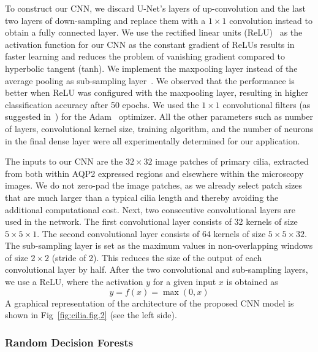 To construct our CNN, we discard U-Net's layers of up-convolution and the last two layers of down-sampling and replace them with a $1 \times 1$ convolution instead to obtain a fully connected layer. We use the rectified linear units (ReLU)~\cite{ronneberger_UNet_2015} as the activation function for our CNN as the constant gradient of ReLUs results in faster learning and reduces the problem of vanishing gradient compared to hyperbolic tangent (tanh). We implement the maxpooling layer instead of the average pooling as sub-sampling layer~\cite{krizhevsky_Imagenet_2017}. We observed that the performance is better when ReLU was configured with the maxpooling layer, resulting in higher classification accuracy after 50 epochs. We used the $1 \times 1$ convolutional filters (as suggested in~\cite{gupta_Convolutional_2017}) for the Adam~\cite{kingma_Variational_2015} optimizer. All the other parameters such as number of layers, convolutional kernel size, training algorithm, and the number of neurons in the final dense layer were all experimentally determined for our application.

The inputs to our CNN are the $32 \times 32$ image patches of primary cilia, extracted from both within AQP2 expressed regions and elsewhere within the microscopy images. We do not zero-pad the image patches, as we already select patch sizes that are much larger than a typical cilia length and thereby avoiding the additional computational cost. Next, two consecutive convolutional layers are used in the network. The first convolutional layer consists of 32 kernels of size $5 \times 5 \times 1$. The second convolutional layer consists of 64 kernels of size $5 \times 5 \times 32$. The sub-sampling layer is set as the maximum values in non-overlapping windows of size $2 \times 2$ (stride of 2). This reduces the size of the output of each convolutional layer by half. After the two convolutional and sub-sampling layers, we use a ReLU, where the activation $y$ for a given input $x$ is obtained as
\begin{equation}
y = f(x) = \max{(0,x)}
\label{eq:cilia.eq.1}
\end{equation}
A graphical representation of the architecture of the proposed CNN model is shown in Fig~\ref{fig:cilia.fig.2} (see the left side).

\subsubsection{\textbf{Random Decision Forests}}

